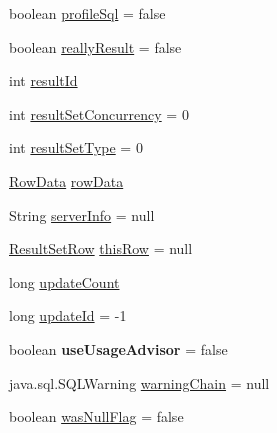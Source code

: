 \begin{DoxyCompactItemize}
boolean \mbox{\hyperlink{classcom_1_1mysql_1_1jdbc_1_1_result_set_impl_a2aac12ce40bed0c1cd6bff9079bbe18d}{profile\+Sql}} = false
\item 
boolean \mbox{\hyperlink{classcom_1_1mysql_1_1jdbc_1_1_result_set_impl_a8c7a043692d662311d44bff08d1a2f7c}{really\+Result}} = false
\item 
int \mbox{\hyperlink{classcom_1_1mysql_1_1jdbc_1_1_result_set_impl_a4f5560f0e6c81cc1eb024986d2c86df3}{result\+Id}}
\item 
int \mbox{\hyperlink{classcom_1_1mysql_1_1jdbc_1_1_result_set_impl_a5acae7beb8d7ec555efce2e63cf14518}{result\+Set\+Concurrency}} = 0
\item 
int \mbox{\hyperlink{classcom_1_1mysql_1_1jdbc_1_1_result_set_impl_a0742345f007dbe5d42261064fb8515f1}{result\+Set\+Type}} = 0
\item 
\mbox{\hyperlink{interfacecom_1_1mysql_1_1jdbc_1_1_row_data}{Row\+Data}} \mbox{\hyperlink{classcom_1_1mysql_1_1jdbc_1_1_result_set_impl_aa7b20a6bcabd71de296fe1acc7f0be6e}{row\+Data}}
\item 
String \mbox{\hyperlink{classcom_1_1mysql_1_1jdbc_1_1_result_set_impl_a1978126a8690324ff1151606d44bfae6}{server\+Info}} = null
\item 
\mbox{\hyperlink{classcom_1_1mysql_1_1jdbc_1_1_result_set_row}{Result\+Set\+Row}} \mbox{\hyperlink{classcom_1_1mysql_1_1jdbc_1_1_result_set_impl_a43c7e703659cfbb8b7af67bd9b199b25}{this\+Row}} = null
\item 
long \mbox{\hyperlink{classcom_1_1mysql_1_1jdbc_1_1_result_set_impl_a3278756f102c97b9e4f5e5aa53590722}{update\+Count}}
\item 
long \mbox{\hyperlink{classcom_1_1mysql_1_1jdbc_1_1_result_set_impl_a7f4e21e7f44998dd4607f6e6dedf265e}{update\+Id}} = -\/1
\item 
\mbox{\label{classcom_1_1mysql_1_1jdbc_1_1_result_set_impl_aa28d2249d18e335d099331646bab5520}} 
boolean {\bfseries use\+Usage\+Advisor} = false
\item 
java.\+sql.\+S\+Q\+L\+Warning \mbox{\hyperlink{classcom_1_1mysql_1_1jdbc_1_1_result_set_impl_a2396d9d0d12077ce0093cf0b979a6eaa}{warning\+Chain}} = null
\item 
boolean \mbox{\hyperlink{classcom_1_1mysql_1_1jdbc_1_1_result_set_impl_ad745afd943c6121eb849bdd3769f5049}{was\+Null\+Flag}} = false
\item 
\mbox{\label{classcom_1_1mysql_1_1jdbc_1_1_result_set_impl_ae1e000014860f76114b9da4437fe4801}} 

\end{DoxyCompactItemize}
